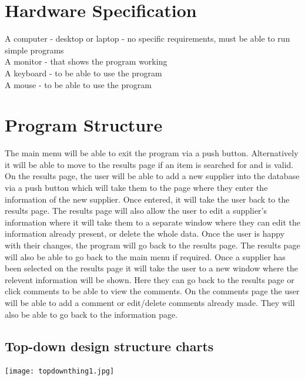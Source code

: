 \section{Hardware Specification}

A computer - desktop or laptop - no specific requirements, must be able to run simple programs\\
A monitor - that shows the program working\\
A keyboard - to be able to use the program\\
A mouse - to be able to use the program\\

\section{Program Structure}
 The main menu will be able to exit the program via a push button. Alternatively it will be able to move to the results page if an item is searched for and is valid. On the results page, the user will be able to add a new supplier into the database via a push button which will take them to the page where they enter the information of the new supplier. Once entered, it will take the user back to the results page. The results page will also allow the user to edit a supplier's information where it will take them to a separate window where they can edit the information already present, or delete the whole data. Once the user is happy with their changes, the program will go back to the results page. The results page will also be able to go back to the main menu if required. Once a supplier has been selected on the results page it will take the user to a new window where the relevent information will be shown. Here they can go back to the results page or click comments to be able to view the comments. On the comments page the user will be able to add a comment or edit/delete comments already made. They will also be able to go back to the information page.

\subsection{Top-down design structure charts}

\begin{center}
\texttt{[image: topdownthing1.jpg]}
\end{center}


